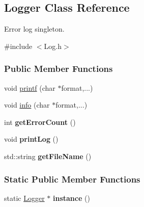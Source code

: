 \hypertarget{classLogger}{
\subsection{Logger Class Reference}
\label{classLogger}
}


Error log singleton.  




{\ttfamily \#include $<$Log.h$>$}

\subsubsection*{Public Member Functions}
\begin{DoxyCompactItemize}
\item 
\hypertarget{classLogger_a97d14a6dbc7c4490cbe590a0925bc42d}{
void \hyperlink{classLogger_a97d14a6dbc7c4490cbe590a0925bc42d}{printf} (char $\ast$format,...)}
\label{classLogger_a97d14a6dbc7c4490cbe590a0925bc42d}

\item 
\hypertarget{classLogger_ad0747538d6c19da8a5ae15ad6483a997}{
void \hyperlink{classLogger_ad0747538d6c19da8a5ae15ad6483a997}{info} (char $\ast$format,...)}
\label{classLogger_ad0747538d6c19da8a5ae15ad6483a997}

\item 
\hypertarget{classLogger_a4739f36877383f53e3ce13200087a104}{
int {\bfseries getErrorCount} ()}
\label{classLogger_a4739f36877383f53e3ce13200087a104}

\item 
\hypertarget{classLogger_a01d17329a2a7f038570c6c769c90cdef}{
void {\bfseries printLog} ()}
\label{classLogger_a01d17329a2a7f038570c6c769c90cdef}

\item 
\hypertarget{classLogger_a5e7512550a4c84d23de47454356aa8f2}{
std::string {\bfseries getFileName} ()}
\label{classLogger_a5e7512550a4c84d23de47454356aa8f2}

\end{DoxyCompactItemize}
\subsubsection*{Static Public Member Functions}
\begin{DoxyCompactItemize}
\item 
\hypertarget{classLogger_a9f9acae64a5f26267526d16196ea23c8}{
static \hyperlink{classLogger}{Logger} $\ast$ {\bfseries instance} ()}
\label{classLogger_a9f9acae64a5f26267526d16196ea23c8}

\end{DoxyCompactItemize}


